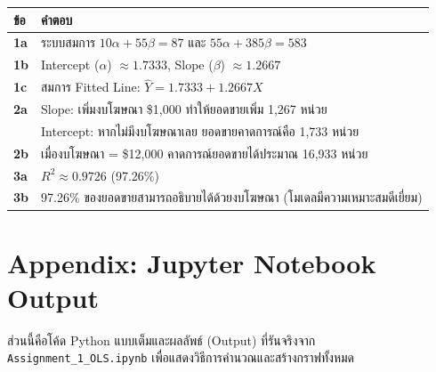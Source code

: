 \documentclass[12pt,a4paper]{article}
\begin{document}
\begin{table}[H]
\centering
\begin{tabular}{l l}
\toprule
\textbf{ข้อ} & \textbf{คำตอบ} \\
\midrule
\textbf{1a} & ระบบสมการ $10\alpha + 55\beta = 87$ และ $55\alpha + 385\beta = 583$ \\
\textbf{1b} & Intercept ($\alpha$) $\approx 1.7333$, \quad Slope ($\beta$) $\approx 1.2667$ \\
\textbf{1c} & สมการ Fitted Line: $\hat{Y} = 1.7333 + 1.2667X$ \\
\textbf{2a} & Slope: เพิ่มงบโฆษณา \$1,000 ทำให้ยอดขายเพิ่ม 1,267 หน่วย \\
            & Intercept: หากไม่มีงบโฆษณาเลย ยอดขายคาดการณ์คือ 1,733 หน่วย \\
\textbf{2b} & เมื่องบโฆษณา = \$12,000 คาดการณ์ยอดขายได้ประมาณ 16,933 หน่วย \\
\textbf{3a} & $R^2 \approx 0.9726$ (97.26\%) \\
\textbf{3b} & 97.26\% ของยอดขายสามารถอธิบายได้ด้วยงบโฆษณา (โมเดลมีความเหมาะสมดีเยี่ยม) \\
\bottomrule
\end{tabular}
\end{table}

\newpage
\section*{Appendix: Jupyter Notebook Output}

\noindent
ส่วนนี้คือโค้ด Python แบบเต็มและผลลัพธ์ (Output) ที่รันจริงจาก \texttt{Assignment\_1\_OLS.ipynb} เพื่อแสดงวิธีการคำนวณและสร้างกราฟทั้งหมด


\end{document}
